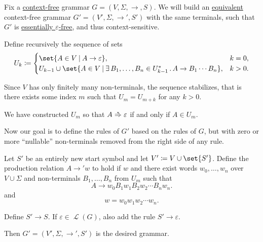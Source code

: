 \begin{algorithm}\label{alg:epsilon_rule_removal}
  Fix a \hyperref[def:chomsky_hierarchy/context_free]{context-free} grammar \( G = (V, \Sigma, \to, S) \). We will build an \hyperref[def:formal_grammar/equivalent]{equivalent} context-free grammar \( G' = (V', \Sigma, \to', S') \) with the same terminals, such that \( G' \) is \hyperref[def:epsilon_free_grammar]{essentially \( \varepsilon \)-free}, and thus context-sensitive.

  \begin{thmenum}
     Define recursively the sequence of sets
    \begin{equation*}
      U_k \coloneqq \begin{cases}
        \set{ A \in V \given A \to \varepsilon },                                                          &k = 0, \\
        U_{k-1} \cup \set{ A \in V \given \qexists{B_1, \ldots, B_n \in U_{k-1}^*} A \to B_1 \cdots B_n }, &k > 0.
      \end{cases}
    \end{equation*}

    Since \( V \) has only finitely many non-terminals, the sequence stabilizes, that is there exists some index \( m \) such that \( U_m = U_{m+k} \) for any \( k > 0 \).

    We have constructed \( U_m \) so that \( A \reloset {*} \Rightarrow \varepsilon \) if and only if \( A \in U_m \).

     Now our goal is to define the rules of \( G' \) based on the rules of \( G \), but with zero or more \enquote{nullable} non-terminals removed from the right side of any rule.

    Let \( S' \) be an entirely new start symbol and let \( V' \coloneqq V \cup \set{ S' } \). Define the production relation \( A \to' w \) to hold if \( w \)  and there exist words \( w_0, \ldots, w_n \) over \( V \cup \Sigma \) and non-terminals \( B_1, \ldots, B_n \) from \( U_m \) such that
    \begin{equation*}
      A \to w_0 B_1 w_1 B_2 w_2 \cdots B_n w_n.
    \end{equation*}
    and
    \begin{equation*}
      w = w_0 w_1 w_2 \cdots w_n.
    \end{equation*}

     Define \( S' \to S \). If \( \varepsilon \in \mscrL(G) \), also add the rule \( S' \to \varepsilon \).

    Then \( G' = (V', \Sigma, \to', S') \) is the desired grammar.
  \end{thmenum}
\end{algorithm}

